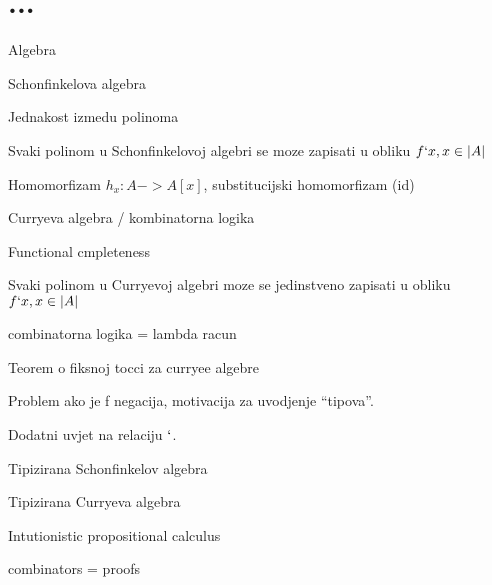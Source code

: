 \section{...}

\begin{definition}
  Algebra
\end{definition}
\begin{definition}
  Schonfinkelova algebra
\end{definition}
\begin{definition}
  Jednakost izmedu polinoma
\end{definition}
\begin{teorem}
  Svaki polinom u Schonfinkelovoj algebri se moze zapisati u obliku $f`x, x \in |A|$
\end{teorem}

\begin{definition}
  Homomorfizam $h_x : A -> A[x]$, substitucijski homomorfizam (id)
\end{definition}

\begin{definition}
  Curryeva algebra / kombinatorna logika
\end{definition}
\begin{definition}
  Functional cmpleteness
\end{definition}


\begin{teorem}
  Svaki polinom u Curryevoj algebri moze se jedinstveno zapisati u obliku $f`x, x \in |A|$
\end{teorem}
\begin{koloral}
  combinatorna logika = lambda racun
\end{koloral}

\begin{teorem}
  Teorem o fiksnoj tocci za curryee algebre
\end{teorem}

Problem ako je f negacija, motivacija za uvodjenje ``tipova''.

\begin{definition}
  Dodatni uvjet na relaciju $`$.

  \begin{prooftree}
  \end{prooftree}
\end{definition}

\begin{definition}
  Tipizirana Schonfinkelov algebra
\end{definition}

\begin{definition}
  Tipizirana Curryeva algebra
\end{definition}

\begin{definition}
  Intutionistic propositional calculus
\end{definition}

\begin{definition}
\end{definition}

\begin{definition}
  combinators = proofs
\end{definition}





